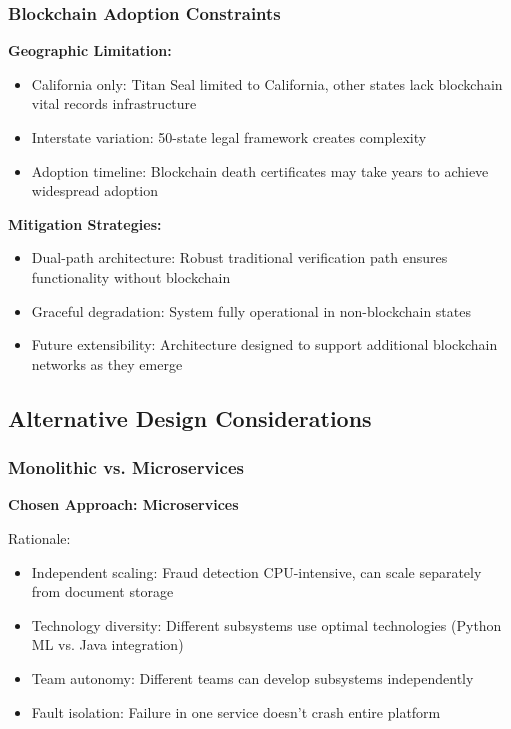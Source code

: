 \subsubsection{Blockchain Adoption Constraints}

\textbf{Geographic Limitation:}
\begin{itemize}
\item California only: Titan Seal limited to California, other states lack blockchain vital records infrastructure
\item Interstate variation: 50-state legal framework creates complexity
\item Adoption timeline: Blockchain death certificates may take years to achieve widespread adoption
\end{itemize}

\textbf{Mitigation Strategies:}
\begin{itemize}
\item Dual-path architecture: Robust traditional verification path ensures functionality without blockchain
\item Graceful degradation: System fully operational in non-blockchain states
\item Future extensibility: Architecture designed to support additional blockchain networks as they emerge
\end{itemize}

\subsection{Alternative Design Considerations}

\subsubsection{Monolithic vs. Microservices}

\textbf{Chosen Approach: Microservices}

Rationale:
\begin{itemize}
\item Independent scaling: Fraud detection CPU-intensive, can scale separately from document storage
\item Technology diversity: Different subsystems use optimal technologies (Python ML vs. Java integration)
\item Team autonomy: Different teams can develop subsystems independently
\item Fault isolation: Failure in one service doesn't crash entire platform
\end{itemize}

